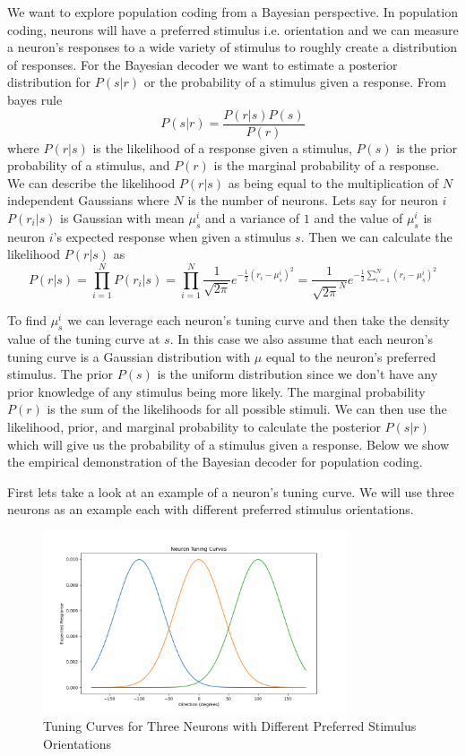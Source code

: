 \documentclass[12pt, letterpaper]{article}
\begin{document}
We want to explore population coding from a Bayesian perspective. In population coding, neurons will have a preferred stimulus i.e. orientation and we can measure a neuron's responses to a wide variety of stimulus to roughly create a distribution of responses. For the Bayesian decoder we want to estimate a posterior distribution for $P(s|r)$ or the probability of a stimulus given a response. From bayes rule 
\[ P(s|r) = \frac{P(r|s)P(s)}{P(r)} \] where $P(r|s)$ is the likelihood of a response given a stimulus, $P(s)$ is the prior probability of a stimulus, and $P(r)$ is the marginal probability of a response. We can describe the likelihood $P(r|s)$ as being equal to the multiplication of $N$ independent Gaussians where $N$ is the number of neurons. Lets say for neuron $i$ $P(r_i|s)$ is Gaussian with mean $\mu_{s}^i$ and a variance of $1$ and the value of $\mu_{s}^i$ is neuron $i$'s expected response when given a stimulus $s$. Then we can calculate the likelihood $P(r|s)$ as
\[ P(r|s) = \prod_{i=1}^{N} P(r_i|s) = \prod_{i=1}^{N} \frac{1}{\sqrt{2\pi}}e^{-\frac{1}{2}(r_i - \mu_{s}^i)^2} = \frac{1}{{\sqrt{2\pi}}^N}e^{-\frac{1}{2}\sum_{i=1}^{N}(r_i - \mu_{s}^i)^2}\]

To find $\mu_{s}^i$ we can leverage each neuron's tuning curve and then take the density value of the tuning curve at $s$. In this case we also assume that each neuron's tuning curve is a Gaussian distribution with $\mu$ equal to the neuron's preferred stimulus. The prior $P(s)$ is the uniform distribution since we don't have any prior knowledge of any stimulus being more likely. The marginal probability $P(r)$ is the sum of the likelihoods for all possible stimuli. We can then use the likelihood, prior, and marginal probability to calculate the posterior $P(s|r)$ which will give us the probability of a stimulus given a response. Below we show the empirical demonstration of the Bayesian decoder for population coding.

First lets take a look at an example of a neuron's tuning curve. We will use three neurons as an example each with different preferred stimulus orientations.

\begin{figure}[H]
    \centering
    \includegraphics[width=0.8\textwidth]{3_neuron_tuning_curves.png}
    \caption{Tuning Curves for Three Neurons with Different Preferred Stimulus Orientations}
    \label{fig:3_neuron_tuning_curves}
\end{figure}
\end{document}
